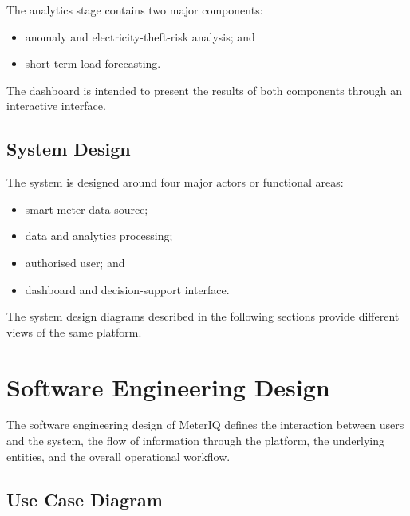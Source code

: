 \documentclass{tietreport}
\begin{document}
The analytics stage contains two major components:

\begin{itemize}
    \item anomaly and electricity-theft-risk analysis; and
    \item short-term load forecasting.
\end{itemize}

The dashboard is intended to present the results of both components through
an interactive interface.

\subsection{System Design}

The system is designed around four major actors or functional areas:

\begin{itemize}
    \item smart-meter data source;
    \item data and analytics processing;
    \item authorised user; and
    \item dashboard and decision-support interface.
\end{itemize}

The system design diagrams described in the following sections provide
different views of the same platform.


\section{Software Engineering Design}

The software engineering design of MeterIQ defines the interaction between
users and the system, the flow of information through the platform, the
underlying entities, and the overall operational workflow.

\subsection{Use Case Diagram}
\end{document}
